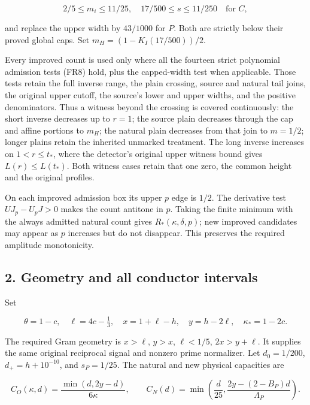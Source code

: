 \[
2/5\le m_i\le11/25,\quad17/500\le s\le11/250
\quad\text{for }C,
\]

and replace the upper width by \(43/1000\) for \(P\). Both are strictly below their proved global caps. Set \(m_H=(1-K_I(17/500))/2\).

Every improved count is used only where all the fourteen strict polynomial admission tests (FR8) hold, plus the capped-width test when applicable. Those tests retain the full inverse range, the plain crossing, source and natural tail joins, the original upper cutoff, the source's lower and upper widths, and the positive denominators. Thus a witness beyond the crossing is covered continuously: the short inverse decreases up to \(r=1\); the source plain decreases through the cap and affine portions to \(m_H\); the natural plain decreases from that join to \(m=1/2\); longer plains retain the inherited unmarked treatment. The long inverse increases on \(1<r\le t_*\), where the detector's original upper witness bound gives \(L(r)\le L(t_*)\). Both witness cases retain that one zero, the common height and the original profiles.

On each improved admission box its upper \(p\) edge is \(1/2\). The derivative test \(UJ_p-U_pJ>0\) makes the count antitone in \(p\). Taking the finite minimum with the always admitted natural count gives \(R_*(\kappa,\delta,p)\); new improved candidates may appear as \(p\) increases but do not disappear. This preserves the required amplitude monotonicity.

\hypertarget{return:geometry-and-all-conductor-intervals}{%
\subsection{2. Geometry and all conductor intervals}\label{return:geometry-and-all-conductor-intervals}}

Set

\[
 \theta=1-c,\quad\ell=4c-\tfrac13,\quad
 x=1+\ell-h,\quad y=h-2\ell,\quad\kappa_*=1-2c.
\tag{NR3}
\]

The required Gram geometry is \(x>\ell\), \(y>x\), \(\ell<1/5\), \(2x>y+\ell\). It supplies the same original reciprocal signal and nonzero prime normalizer. Let \(d_0=1/200\), \(d_+=h+10^{-10}\), and \(s_P=1/25\). The natural and new physical capacities are

\[
 C_O(\kappa,d)=\frac{\min(d,2y-d)}{6\kappa},\qquad
 C_N(d)=\min\left(\frac d{25},
                 \frac{2y-(2-B_P)d}{\Lambda_P}\right).
\tag{NR4}
\]


